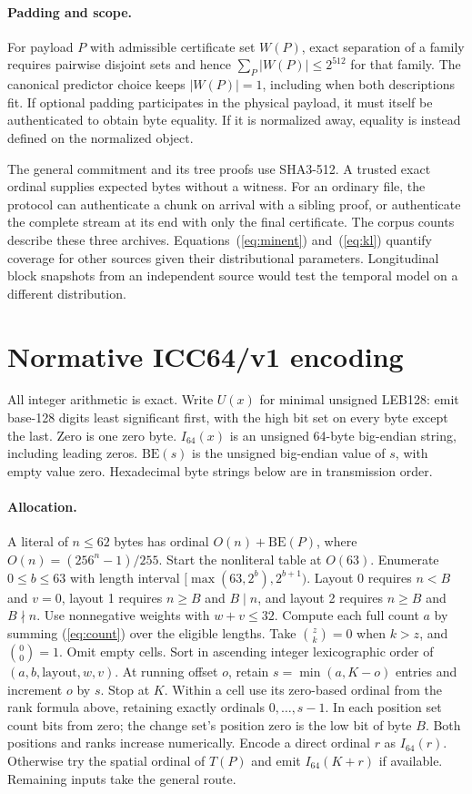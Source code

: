 \documentclass[10pt,twocolumn,letterpaper]{article}
\begin{document}
\paragraph{Padding and scope.}
For payload \(P\) with admissible certificate set \(W(P)\), exact separation of a family requires pairwise disjoint sets and hence \(\sum_P|W(P)|\le 2^{512}\) for that family. The canonical predictor choice keeps \(|W(P)|=1\), including when both descriptions fit. If optional padding participates in the physical payload, it must itself be authenticated to obtain byte equality. If it is normalized away, equality is instead defined on the normalized object.

The general commitment and its tree proofs use SHA3-512. A trusted exact ordinal supplies expected bytes without a witness. For an ordinary file, the protocol can authenticate a chunk on arrival with a sibling proof, or authenticate the complete stream at its end with only the final certificate. The corpus counts describe these three archives. Equations~(\ref{eq:minent}) and~(\ref{eq:kl}) quantify coverage for other sources given their distributional parameters. Longitudinal block snapshots from an independent source would test the temporal model on a different distribution.

\section{Normative ICC64/v1 encoding}\label{sec:wire}
All integer arithmetic is exact. Write \(U(x)\) for minimal unsigned LEB128: emit base-128 digits least significant first, with the high bit set on every byte except the last. Zero is one zero byte. \(I_{64}(x)\) is an unsigned 64-byte big-endian string, including leading zeros. \(\mathrm{BE}(s)\) is the unsigned big-endian value of \(s\), with empty value zero. Hexadecimal byte strings below are in transmission order.

\paragraph{Allocation.}
A literal of \(n\le62\) bytes has ordinal \(O(n)+\mathrm{BE}(P)\), where \(O(n)=(256^n-1)/255\). Start the nonliteral table at \(O(63)\). Enumerate \(0\le b\le63\) with length interval \([\max(63,2^b),2^{b+1})\). Layout 0 requires \(n<B\) and \(v=0\), layout 1 requires \(n\ge B\) and \(B\mid n\), and layout 2 requires \(n\ge B\) and \(B\nmid n\). Use nonnegative weights with \(w+v\le32\). Compute each full count \(a\) by summing (\ref{eq:count}) over the eligible lengths. Take \(\binom zk=0\) when \(k>z\), and \(\binom00=1\). Omit empty cells. Sort in ascending integer lexicographic order of \((a,b,\mathrm{layout},w,v)\). At running offset \(o\), retain \(s=\min(a,K-o)\) entries and increment \(o\) by \(s\). Stop at \(K\). Within a cell use its zero-based ordinal from the rank formula above, retaining exactly ordinals \(0,\ldots,s-1\). In each position set count bits from zero; the change set's position zero is the low bit of byte \(B\). Both positions and ranks increase numerically. Encode a direct ordinal \(r\) as \(I_{64}(r)\). Otherwise try the spatial ordinal of \(T(P)\) and emit \(I_{64}(K+r)\) if available. Remaining inputs take the general route.
\end{document}
